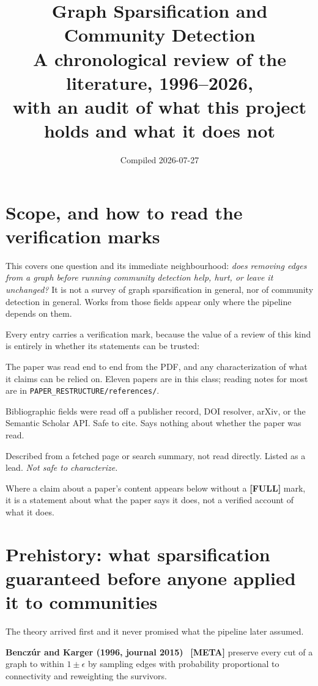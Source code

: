 \documentclass[10pt,a4paper]{article}
\title{\textbf{Graph Sparsification and Community Detection}\\[2pt]
\large A chronological review of the literature, 1996--2026,\\
with an audit of what this project holds and what it does not}
\author{Compiled 2026-07-27}
\date{}
\begin{document}
\maketitle

\section*{Scope, and how to read the verification marks}

This covers one question and its immediate neighbourhood: \emph{does removing edges from a graph
before running community detection help, hurt, or leave it unchanged?} It is not a survey of
graph sparsification in general, nor of community detection in general. Works from those fields
appear only where the pipeline depends on them.

Every entry carries a verification mark, because the value of a review of this kind is entirely
in whether its statements can be trusted:

\begin{description}[leftmargin=2.6em,style=nextline]
\item[\textbf{[FULL]}] The paper was read end to end from the PDF, and any characterization of
what it claims can be relied on. Eleven papers are in this class; reading notes for most are in
\texttt{PAPER\_RESTRUCTURE/references/}.
\item[\textbf{[META]}] Bibliographic fields were read off a publisher record, DOI resolver,
arXiv, or the Semantic Scholar API. Safe to cite. Says nothing about whether the paper was read.
\item[\textbf{[2ND]}] Described from a fetched page or search summary, not read directly. Listed
as a lead. \emph{Not safe to characterize.}
\end{description}

Where a claim about a paper's content appears below without a \textbf{[FULL]} mark, it is a
statement about what the paper says it does, not a verified account of what it does.

\section{Prehistory: what sparsification guaranteed before anyone applied it to communities}

The theory arrived first and it never promised what the pipeline later assumed.

\textbf{Bencz\'ur and Karger (1996, journal 2015)}~\cite{benczur2015randomized} \textbf{[META]}
preserve every cut of a graph to within $1 \pm \epsilon$ by sampling edges with probability
proportional to connectivity and reweighting the survivors.
\end{document}
